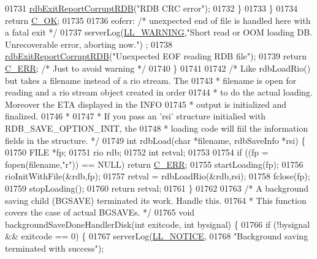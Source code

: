 \begin{DoxyCode}
{{{{{{{{{{{{{{{{{{{{{{{{{{{{{{{{{{01731             \hyperlink{rdb_8c_afb34e310c0e5dfd9f8c2bebbec59c7f7}{rdbExitReportCorruptRDB}(\textcolor{stringliteral}{"RDB CRC error"});
01732         \}
01733     \}
01734     \textcolor{keywordflow}{return} \hyperlink{server_8h_a303769ef1065076e68731584e758d3e1}{C\_OK};
01735 
01736 eoferr: \textcolor{comment}{/* unexpected end of file is handled here with a fatal exit */}
01737     serverLog(\hyperlink{server_8h_a31229b9334bba7d6be2a72970967a14b}{LL\_WARNING},\textcolor{stringliteral}{"Short read or OOM loading DB. Unrecoverable error, aborting now."})
      ;
01738     \hyperlink{rdb_8c_afb34e310c0e5dfd9f8c2bebbec59c7f7}{rdbExitReportCorruptRDB}(\textcolor{stringliteral}{"Unexpected EOF reading RDB file"});
01739     \textcolor{keywordflow}{return} \hyperlink{server_8h_af98ac28d5f4d23d7ed5985188e6fb7d1}{C\_ERR}; \textcolor{comment}{/* Just to avoid warning */}
01740 \}
01741 
01742 \textcolor{comment}{/* Like rdbLoadRio() but takes a filename instead of a rio stream. The}
01743 \textcolor{comment}{ * filename is open for reading and a rio stream object created in order}
01744 \textcolor{comment}{ * to do the actual loading. Moreover the ETA displayed in the INFO}
01745 \textcolor{comment}{ * output is initialized and finalized.}
01746 \textcolor{comment}{ *}
01747 \textcolor{comment}{ * If you pass an 'rsi' structure initialied with RDB\_SAVE\_OPTION\_INIT, the}
01748 \textcolor{comment}{ * loading code will fiil the information fields in the structure. */}
01749 \textcolor{keywordtype}{int} rdbLoad(\textcolor{keywordtype}{char} *filename, rdbSaveInfo *rsi) \{
01750     FILE *fp;
01751     rio rdb;
01752     \textcolor{keywordtype}{int} retval;
01753 
01754     \textcolor{keywordflow}{if} ((fp = fopen(filename,\textcolor{stringliteral}{"r"})) == NULL) \textcolor{keywordflow}{return} \hyperlink{server_8h_af98ac28d5f4d23d7ed5985188e6fb7d1}{C\_ERR};
01755     startLoading(fp);
01756     rioInitWithFile(&rdb,fp);
01757     retval = rdbLoadRio(&rdb,rsi);
01758     fclose(fp);
01759     stopLoading();
01760     \textcolor{keywordflow}{return} retval;
01761 \}
01762 
01763 \textcolor{comment}{/* A background saving child (BGSAVE) terminated its work. Handle this.}
01764 \textcolor{comment}{ * This function covers the case of actual BGSAVEs. */}
01765 \textcolor{keywordtype}{void} backgroundSaveDoneHandlerDisk(\textcolor{keywordtype}{int} exitcode, \textcolor{keywordtype}{int} bysignal) \{
01766     \textcolor{keywordflow}{if} (!bysignal && exitcode == 0) \{
01767         serverLog(\hyperlink{server_8h_a8c54c191e436c7dd3012167212692401}{LL\_NOTICE},
01768             \textcolor{stringliteral}{"Background saving terminated with success"});
}}}}}}}}}}}}}}}}}}}}}}}}}}}}}}}}}}
\end{DoxyCode}
